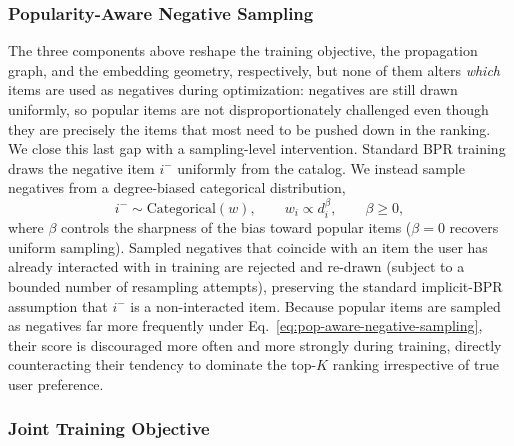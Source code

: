 \subsubsection{Popularity-Aware Negative Sampling}
\label{sec:popularity_aware_negative_sampling}

The three components above reshape the training objective, the propagation graph, and the
embedding geometry, respectively, but none of them alters \emph{which} items are used as
negatives during optimization: negatives are still drawn uniformly, so popular items are not
disproportionately challenged even though they are precisely the items that most need to be
pushed down in the ranking. We close this last gap with a sampling-level intervention.
Standard BPR training draws the negative item $i^-$ uniformly from the catalog. We instead
sample negatives from a degree-biased categorical distribution,
\begin{equation}
    i^- \sim \mathrm{Categorical}(w), \qquad w_i \propto d_i^{\beta}, \qquad \beta \ge 0,
    \label{eq:pop-aware-negative-sampling}
\end{equation}
where $\beta$ controls the sharpness of the bias toward popular items ($\beta=0$ recovers
uniform sampling). Sampled negatives that coincide with an item the user has already
interacted with in training are rejected and re-drawn (subject to a bounded number of
resampling attempts), preserving the standard implicit-BPR assumption that $i^-$ is a
non-interacted item. Because popular items are sampled as negatives far more frequently under
Eq.~\eqref{eq:pop-aware-negative-sampling}, their score is discouraged more often and more
strongly during training, directly counteracting their tendency to dominate the top-$K$
ranking irrespective of true user preference.

\subsubsection{Joint Training Objective}
\label{sec:joint_training_objective}

